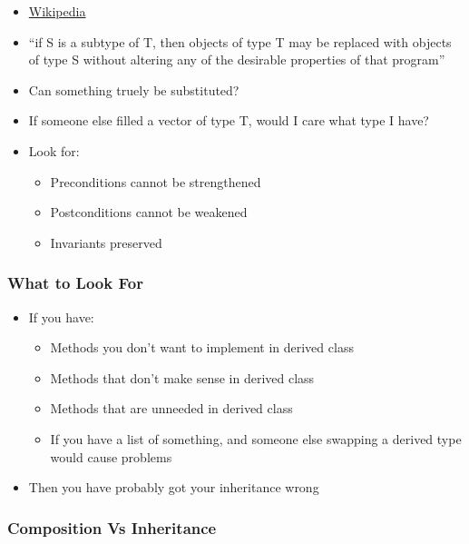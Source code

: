 \begin{itemize}
\itemsep1pt\parskip0pt
\item
  \href{https://en.wikipedia.org/wiki/Liskov_substitution_principle}{Wikipedia}
\item
  ``if S is a subtype of T, then objects of type T may be replaced with
  objects of type S without altering any of the desirable properties of
  that program''
\item
  Can something truely be substituted?
\item
  If someone else filled a vector of type T, would I care what type I
  have?
\item
  Look for:

  \begin{itemize}
  \itemsep1pt\parskip0pt
  \item
    Preconditions cannot be strengthened
  \item
    Postconditions cannot be weakened
  \item
    Invariants preserved
  \end{itemize}
\end{itemize}

\subsubsection{What to Look For}\label{what-to-look-for}

\begin{itemize}
\itemsep1pt\parskip0pt
\item
  If you have:

  \begin{itemize}
  \itemsep1pt\parskip0pt
  \item
    Methods you don't want to implement in derived class
  \item
    Methods that don't make sense in derived class
  \item
    Methods that are unneeded in derived class
  \item
    If you have a list of something, and someone else swapping a derived
    type would cause problems
  \end{itemize}
\item
  Then you have probably got your inheritance wrong
\end{itemize}

\subsubsection{Composition Vs
Inheritance}\label{composition-vs-inheritance}

